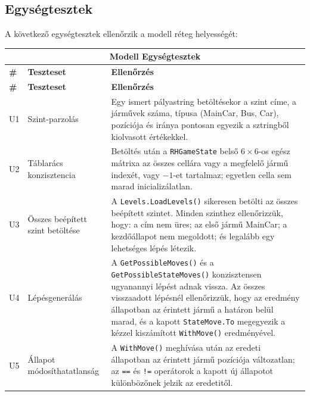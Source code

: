 \subsection{Egységtesztek}

A következő egységtesztek ellenőrzik a modell réteg helyességét:

\begin{center}
\begin{longtable}{ | p{} | p{} | p{} | }

\hline
\multicolumn{3}{|c|}{\textbf{Modell Egységtesztek}}
\\ \hline
\textbf{\#} & \textbf{Teszteset} & \textbf{Ellenőrzés}
\\ \hline \hline
\endfirsthead

\hline
\textbf{\#} & \textbf{Teszteset} & \textbf{Ellenőrzés}
\\ \hline \hline
\endhead

\hline
\endfoot
\endlastfoot

U1
& Szint-parzolás
& Egy ismert pályastring betöltésekor a szint címe, a járművek száma, típusa (MainCar, Bus, Car), pozíciója és iránya pontosan egyezik a sztringből kiolvasott értékekkel.
\\ \hline

U2
& Táblarács konzisztencia
& Betöltés után a \texttt{RHGameState} belső $6\times6$-os egész mátrixa az összes cellára vagy a megfelelő jármű indexét, vagy $-1$-et tartalmaz; egyetlen cella sem marad inicializálatlan.
\\ \hline

U3
& Összes beépített szint betöltése
& A \texttt{Levels.LoadLevels()} sikeresen betölti az összes beépített szintet. Minden szinthez ellenőrizzük, hogy: a cím nem üres; az első jármű MainCar; a kezdőállapot nem megoldott; és legalább egy lehetséges lépés létezik.
\\ \hline

U4
& Lépésgenerálás
& A \texttt{GetPossibleMoves()} és a \texttt{GetPossibleStateMoves()} konzisztensen ugyanannyi lépést adnak vissza. Az összes visszaadott lépésnél ellenőrizzük, hogy az eredmény állapotban az érintett jármű a határon belül marad, és a kapott \texttt{StateMove.To} megegyezik a kézzel kiszámított \texttt{WithMove()} eredményével.
\\ \hline

U5
& Állapot módosíthatatlanság
& A \texttt{WithMove()} meghívása után az eredeti állapotban az érintett jármű pozíciója változatlan; az \texttt{==} és \texttt{!=} operátorok a kapott új állapotot különbözőnek jelzik az eredetitől.
\\ \hline


\end{longtable}
\end{center}
